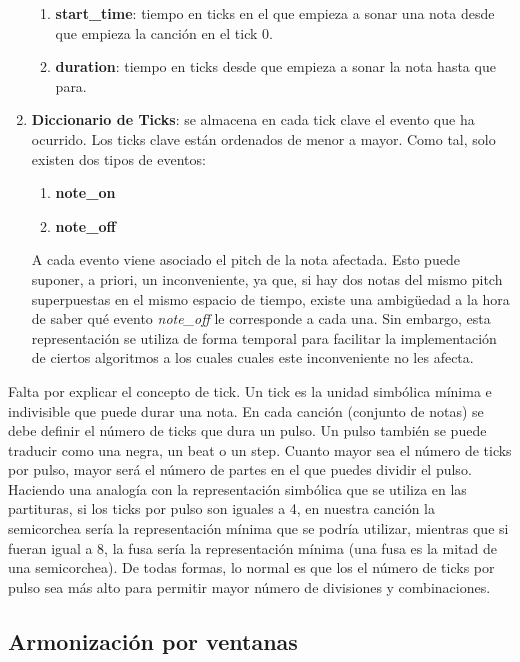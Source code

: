 \begin{enumerate}
\begin{enumerate}
        \item[\textbullet] \textbf{start\_time}: tiempo en ticks en el que empieza a sonar una nota desde que empieza la canción en el tick 0.
        \item[\textbullet] \textbf{duration}: tiempo en ticks desde que empieza a sonar la nota hasta que para.
    \end{enumerate}
    \item \textbf{Diccionario de Ticks}: se almacena en cada tick clave el evento que ha ocurrido. Los ticks clave están ordenados de menor a mayor. Como tal, solo existen dos tipos de eventos: 
    \begin{enumerate}
        \item[\textbullet] \textbf{note\_on}
        \item[\textbullet] \textbf{note\_off}
    \end{enumerate}
    A cada evento viene asociado el pitch de la nota afectada. Esto puede suponer, a priori, un inconveniente, ya que, si hay dos notas del mismo pitch superpuestas en el mismo espacio de tiempo, existe una ambigüedad a la hora de saber qué evento \textit{note\_off} le corresponde a cada una. Sin embargo, esta representación se utiliza de forma temporal para facilitar la implementación de ciertos algoritmos a los cuales cuales este inconveniente no les afecta. 
    
\end{enumerate}

    Falta por explicar el concepto de tick. Un tick es la unidad simbólica mínima e indivisible que puede durar una nota. En cada canción (conjunto de notas) se debe definir el número de ticks que dura un pulso. Un pulso también se puede traducir como una negra, un beat o un step. Cuanto mayor sea el número de ticks por pulso, mayor será el número de partes en el que puedes dividir el pulso. Haciendo una analogía con la representación simbólica que se utiliza en las partituras, si los ticks por pulso son iguales a 4, en nuestra canción la semicorchea sería la representación mínima que se podría utilizar, mientras que si fueran igual a 8, la fusa sería la representación mínima (una fusa es la mitad de una semicorchea). De todas formas, lo normal es que los el número de ticks por pulso sea más alto para permitir mayor número de divisiones y combinaciones.

\subsection{Armonización por ventanas} 

